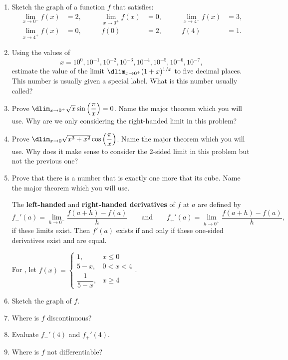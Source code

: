 \documentclass{book}
\begin{document}
\begin{enumerate}[!HW!]
\item Sketch the graph of a function $f$ that satisfies:
\[\begin{alignedat}{100} \lim_{x\to0^-} f(x)&=2,\qquad & \lim_{x\to 0^+} f(x)&=0,\qquad & \lim_{x\to 4^-} f(x)&=3, \\ \lim_{x\to 4^+} f(x)&=0,\ & f(0)&=2,\ & f(4)&=1.\end{alignedat}\]

\item Using the values of \[x = 10^0, 10^{-1}, 10^{-2}, 10^{-3}, 10^{-4}, 10^{-5}, 10^{-6}, 10^{-7}, \] estimate the value of the limit $\dlim_{x\to 0^+} (1+x)^{1/x}$ to five decimal places. This number is usually given a special label. What is this number usually called?


\item  Prove $\dlim_{x\to 0^+} \sqrt{x}\sin\left(\dfrac{\pi}{x}\right) = 0$. Name the major theorem which you will use. Why are we only considering the right-handed limit in this problem?\\

\item Prove $\dlim_{x\to 0} \sqrt{x^3+x^2}\cos\left(\dfrac{\pi}{x}\right)$. Name the major theorem which you will use. Why does it make sense to consider the 2-sided limit in this problem but not the previous one?

\item  Prove that there is a number that is exactly one more that its cube. Name the major theorem which you will use. 

\begin{Def} The \textbf{left-handed} and \textbf{right-handed derivatives} of $f$ at $a$ are defined by 
\[f_-'(a) = \lim_{h\to 0^-} \dfrac{f(a+h)-f(a)}{h}\qquad \text{and} \qquad f_+'(a) = \lim_{h\to 0^+} \dfrac{f(a+h)-f(a)}{h},\] if these limits exist. Then $f'(a)$ exists if and only if these one-sided derivatives exist and are equal.
\end{Def}\vs

For , let $f(x) = \begin{cases} 1, & x\le 0\\ 5-x, & 0< x<4\\ \dfrac{1}{5-x}, &x\ge 4\end{cases}$.

\item\label{exer:leftderivativedefn:start}  Sketch the graph of $f$.
\item Where is $f$ discontinuous?
\item Evaluate $f_-'(4)$ and $f_+'(4)$.
\item\label{exer:leftderivativedefn:stop} Where is $f$ not differentiable?
\end{enumerate}
\pagebreak
\end{document}
